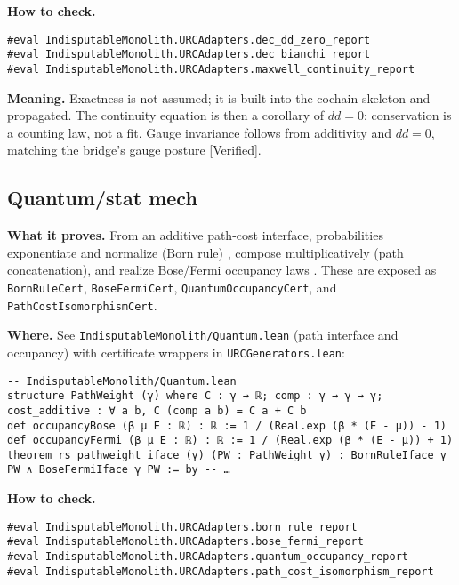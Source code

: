 \documentclass[11pt,a4paper,twoside]{article}
\numberwithin{equation}{section}
\theoremstyle{customthm}
\theoremstyle{customdef}
\theoremstyle{customrem}
\begin{document}
\textbf{How to check.}

\begin{lstlisting}
#eval IndisputableMonolith.URCAdapters.dec_dd_zero_report
#eval IndisputableMonolith.URCAdapters.dec_bianchi_report
#eval IndisputableMonolith.URCAdapters.maxwell_continuity_report
\end{lstlisting}

\textbf{Meaning.} Exactness is not assumed; it is built into the cochain skeleton and propagated. The continuity equation is then a corollary of \(dd=0\): conservation is a counting law, not a fit. Gauge invariance follows from additivity and \(dd=0\), matching the bridge's gauge posture [Verified].

\subsection{Quantum/stat mech}

\textbf{What it proves.} From an additive path-cost interface, probabilities exponentiate and normalize (Born rule) \citep{Born1926,FeynmanHibbs1965}, compose multiplicatively (path concatenation), and realize Bose/Fermi occupancy laws \citep{Bose1924,Einstein1925,Dirac1926}. These are exposed as \texttt{BornRuleCert}, \texttt{BoseFermiCert}, \texttt{QuantumOccupancyCert}, and \texttt{PathCostIsomorphismCert}.

\textbf{Where.} See \texttt{IndisputableMonolith/Quantum.lean} (path interface and occupancy) with certificate wrappers in \texttt{URCGenerators.lean}:

\begin{lstlisting}
-- IndisputableMonolith/Quantum.lean
structure PathWeight (γ) where C : γ → ℝ; comp : γ → γ → γ; cost_additive : ∀ a b, C (comp a b) = C a + C b
def occupancyBose (β μ E : ℝ) : ℝ := 1 / (Real.exp (β * (E - μ)) - 1)
def occupancyFermi (β μ E : ℝ) : ℝ := 1 / (Real.exp (β * (E - μ)) + 1)
theorem rs_pathweight_iface (γ) (PW : PathWeight γ) : BornRuleIface γ PW ∧ BoseFermiIface γ PW := by -- …
\end{lstlisting}

\textbf{How to check.}

\begin{lstlisting}
#eval IndisputableMonolith.URCAdapters.born_rule_report
#eval IndisputableMonolith.URCAdapters.bose_fermi_report
#eval IndisputableMonolith.URCAdapters.quantum_occupancy_report
#eval IndisputableMonolith.URCAdapters.path_cost_isomorphism_report
\end{lstlisting}
\end{document}
